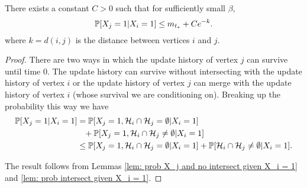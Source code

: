 	\begin{lemma}
		There exists a constant $C > 0$ such that for sufficiently small $\beta$,
		\label{lem:nd X_j given X_i}
		\begin{equation}
			\mathbb{P}[X_j = 1| X_i = 1] \leq m_{t_*} + C e^{-k}.
		\end{equation}
		where $k = d(i,j)$ is the distance between vertices $i$ and $j$.
	\end{lemma}
	\begin{proof}
		There are two ways in which the update history of vertex $j$ can survive until time $0$. The update history can survive without intersecting with the update history of vertex $i$ or the update history of vertex $j$ can merge with the update history of vertex $i$ (whose survival we are conditioning on). %
		Breaking up the probability this way we have
		\begin{align}
			\mathbb{P}[X_j = 1| X_i = 1] &= \mathbb{P}[X_j = 1, \mathcal{H}_i \cap \mathcal{H}_j = \emptyset | X_i = 1] \notag\\
			&\phantom{=}+ \mathbb{P}[X_j = 1, \mathcal{H}_i \cap \mathcal{H}_j \neq \emptyset | X_i = 1]\\
			&\leq \mathbb{P}[X_j = 1, \mathcal{H}_i \cap \mathcal{H}_j = \emptyset | X_i = 1] + \mathbb{P}[\mathcal{H}_i \cap \mathcal{H}_j \neq \emptyset | X_i = 1].
		\end{align}

		The result follows from Lemmas \ref{lem: prob X_j and no intersect given X_i = 1} and \ref{lem: prob intersect given X_i = 1}.
	\end{proof}

